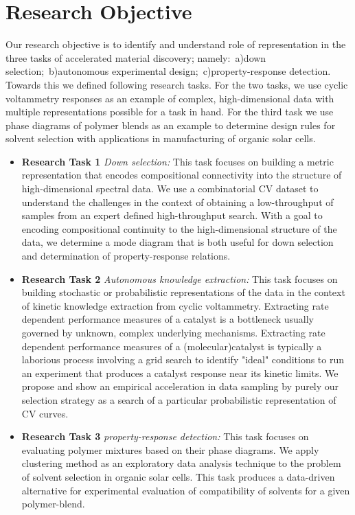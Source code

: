 \section*{Research Objective}
Our research objective is to identify and understand role of representation in the three tasks of accelerated material discovery; namely:~a)down selection;~b)autonomous experimental design;~c)property-response detection. Towards this we defined following research tasks. For the two tasks, we use cyclic voltammetry responses as an example of complex, high-dimensional data with multiple representations possible for a task in hand. For the third task we use phase diagrams of polymer blends as an example to determine design rules for solvent selection with applications in manufacturing of organic solar cells.
\begin{itemize}
    \item {\textbf{Research Task 1 }\textit{Down selection:} This task focuses on building a metric representation that encodes compositional connectivity into the structure of high-dimensional spectral data. We use a combinatorial CV dataset to understand the challenges in the context of obtaining a low-throughput of samples from an expert defined high-throughput search. With a goal to encoding compositional continuity to the high-dimensional structure of the data, we determine a mode diagram that is both useful for down selection and determination of property-response relations.}
    \item{\textbf{Research Task 2 }\textit{Autonomous knowledge extraction:} This task focuses on building stochastic or probabilistic representations of the data in the context of kinetic knowledge extraction from cyclic voltammetry. Extracting rate dependent performance measures of a catalyst is a bottleneck usually governed by unknown, complex underlying mechanisms. Extracting rate dependent performance measures of a (molecular)catalyst is typically a laborious process involving a grid search to identify "ideal" conditions to run an experiment that produces a catalyst response near its kinetic limits. We propose and show an empirical acceleration in data sampling by purely our selection strategy as a search of a particular probabilistic representation of CV curves.}
    \item{\textbf{Research Task 3 }\textit{property-response detection: } This task focuses on evaluating polymer mixtures based on their phase diagrams. We apply clustering method as an exploratory data analysis technique to the problem of solvent selection in organic solar cells. This task produces a data-driven alternative for experimental evaluation of compatibility of solvents for a given polymer-blend.}
\end{itemize}
